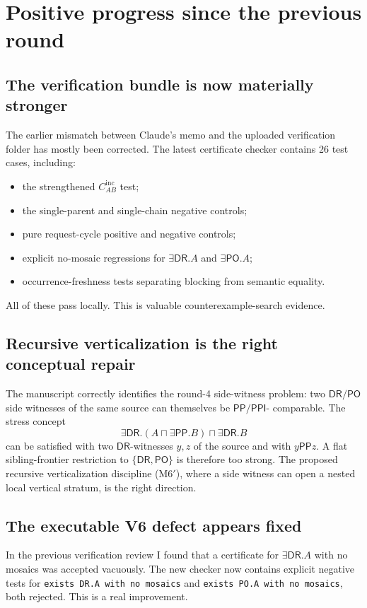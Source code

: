 \documentclass[11pt]{article}
\newcommand{\DR}{\mathsf{DR}}
\newcommand{\PO}{\mathsf{PO}}
\newcommand{\PP}{\mathsf{PP}}
\newcommand{\PPI}{\mathsf{PPI}}
\begin{document}
\section{Positive progress since the previous round}

\subsection{The verification bundle is now materially stronger}

The earlier mismatch between Claude's memo and the uploaded verification folder
has mostly been corrected.  The latest certificate checker contains 26 test
cases, including:
\begin{itemize}[leftmargin=2em]
  \item the strengthened $C_{AB}^{\mathrm{inc}}$ test;
  \item the single-parent and single-chain negative controls;
  \item pure request-cycle positive and negative controls;
  \item explicit no-mosaic regressions for $\exists\DR.A$ and $\exists\PO.A$;
  \item occurrence-freshness tests separating blocking from semantic equality.
\end{itemize}
All of these pass locally.  This is valuable counterexample-search evidence.

\subsection{Recursive verticalization is the right conceptual repair}

The manuscript correctly identifies the round-4 side-witness problem: two
$\DR/\PO$ side witnesses of the same source can themselves be $\PP/\PPI$-
comparable.  The stress concept
\[
  \exists\DR.(A\sqcap\exists\PP.B)\sqcap\exists\DR.B
\]
can be satisfied with two $\DR$-witnesses $y,z$ of the source and with
$y\PP z$.  A flat sibling-frontier restriction to $\{\DR,\PO\}$ is therefore
too strong.  The proposed recursive verticalization discipline (M6$'$), where
a side witness can open a nested local vertical stratum, is the right direction.

\subsection{The executable V6 defect appears fixed}

In the previous verification review I found that a certificate for
$\exists\DR.A$ with no mosaics was accepted vacuously.  The new checker now
contains explicit negative tests for \texttt{exists DR.A with no mosaics} and
\texttt{exists PO.A with no mosaics}, both rejected.  This is a real improvement.
\end{document}
